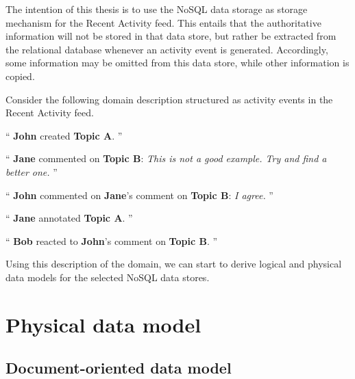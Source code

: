 The intention of this thesis is to use the NoSQL data storage as storage mechanism for the Recent Activity feed.
This entails that the authoritative information will not be stored in that data store, but rather be extracted from the relational database whenever an activity event is generated.
Accordingly, some information may be omitted from this data store, while other information is copied.

Consider the following domain description structured as activity events in the Recent Activity feed.

``
\textbf{John} created \textbf{Topic A}.
''

``
\textbf{Jane} commented on \textbf{Topic B}:
\textit{This is not a good example. Try and find a better one.}
''

``
\textbf{John} commented on \textbf{Jane}'s comment on \textbf{Topic B}:
\textit{I agree.}
''

``
\textbf{Jane} annotated \textbf{Topic A}.
''

``
\textbf{Bob} reacted to \textbf{John}'s comment on \textbf{Topic B}.
''


Using this description of the domain, we can start to derive logical and physical data models for the selected NoSQL data stores.


\section{Physical data model}
\label{sec:physical-data-model}

\subsection{Document-oriented data model}
\label{subsec:document-data-model}


